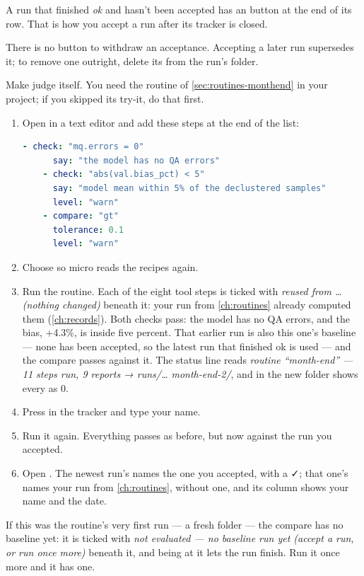 A run that finished \emph{ok} and hasn't been accepted has an  button at the end of its row. That is how you accept a run after its tracker is closed.

There is no button to withdraw an acceptance. Accepting a later run supersedes it; to remove one outright, delete its  from the run's folder.

\begin{tryit}
Make  judge itself. You need the routine of \cref{sec:routines-monthend} in your project; if you skipped its try-it, do that first.
\begin{enumerate}
\item Open  in a text editor and add these steps at the end of the list:
\begin{lstlisting}[language=yaml]
    - check: "mq.errors = 0"
      say: "the model has no QA errors"
    - check: "abs(val.bias_pct) < 5"
      say: "model mean within 5% of the declustered samples"
      level: "warn"
    - compare: "gt"
      tolerance: 0.1
      level: "warn"
\end{lstlisting}
\item Choose  so micro reads the recipes again.
\item Run the routine. Each of the eight tool steps is ticked with \emph{reused from … (nothing changed)} beneath it: your run from \cref{ch:routines} already computed them (\cref{ch:records}). Both checks pass: the model has no QA errors, and the bias, +4.3\%, is inside five percent. That earlier run is also this one's baseline — none has been accepted, so the latest run that finished ok is used — and the compare passes against it. The status line reads \emph{routine “month-end” — 11 steps run, 9 reports → runs/… month-end-2/}, and  in the new folder shows every  as 0.
\item Press  in the tracker and type your name.
\item Run it again. Everything passes as before, but now against the run you accepted.
\item Open . The newest run's  names the one you accepted, with a ✓; that one's names your run from \cref{ch:routines}, without one, and its  column shows your name and the date.
\end{enumerate}
If this was the routine's very first run — a fresh  folder — the compare has no baseline yet: it is ticked with \emph{not evaluated — no baseline run yet (accept a run, or run once more)} beneath it, and being at  it lets the run finish. Run it once more and it has one.
\end{tryit}

